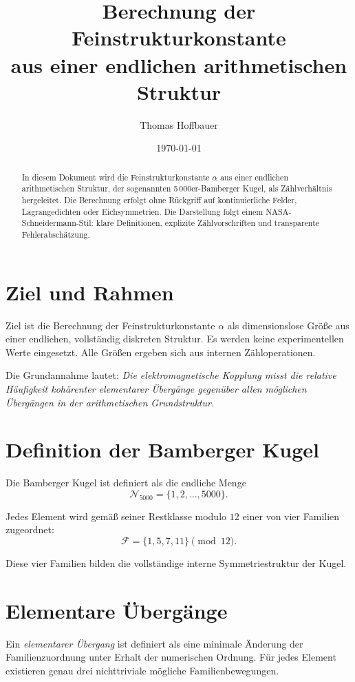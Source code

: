 \documentclass[11pt,a4paper]{article}
\title{\textbf{Berechnung der Feinstrukturkonstante}\\
aus einer endlichen arithmetischen Struktur}
\author{Thomas Hoffbauer}
\date{\today}
\begin{document}
\maketitle

\begin{abstract}
In diesem Dokument wird die Feinstrukturkonstante $\alpha$
aus einer endlichen arithmetischen Struktur,
der sogenannten 5\,000er-Bamberger Kugel,
als Zählverhältnis hergeleitet.
Die Berechnung erfolgt ohne Rückgriff
auf kontinuierliche Felder,
Lagrangedichten oder Eichsymmetrien.
Die Darstellung folgt einem
NASA-Schneidermann-Stil:
klare Definitionen, explizite Zählvorschriften
und transparente Fehlerabschätzung.
\end{abstract}

\section{Ziel und Rahmen}

Ziel ist die Berechnung der Feinstrukturkonstante $\alpha$
als dimensionslose Größe
aus einer endlichen, vollständig diskreten Struktur.
Es werden keine experimentellen Werte eingesetzt.
Alle Größen ergeben sich aus internen Zähloperationen.

Die Grundannahme lautet:
\emph{Die elektromagnetische Kopplung misst die relative Häufigkeit
kohärenter elementarer Übergänge
gegenüber allen möglichen Übergängen
in der arithmetischen Grundstruktur.}

\section{Definition der Bamberger Kugel}

Die Bamberger Kugel ist definiert als die endliche Menge
\[
\mathcal{N}_{5000} = \{1,2,\dots,5000\}.
\]

Jedes Element wird gemäß seiner Restklasse modulo $12$
einer von vier Familien zugeordnet:
\[
\mathcal{F} = \{1,5,7,11\} \pmod{12}.
\]

Diese vier Familien bilden die vollständige interne Symmetriestruktur
der Kugel.

\section{Elementare Übergänge}

Ein \emph{elementarer Übergang} ist definiert als
eine minimale Änderung der Familienzuordnung
unter Erhalt der numerischen Ordnung.
Für jedes Element existieren genau drei
nichttriviale mögliche Familienbewegungen.
\end{document}
